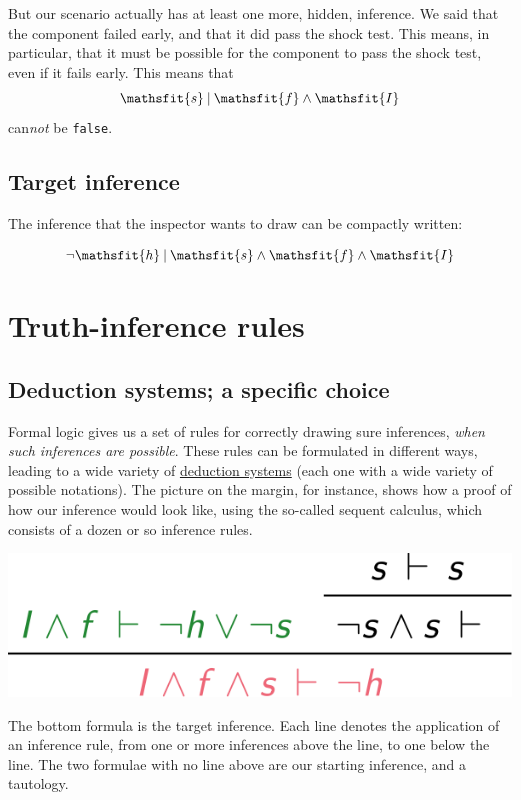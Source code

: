 \documentclass[
  a4paper,
  DIV=11,
  numbers=noendperiod,
  oneside]{scrreprt}
\begin{document}
But our scenario actually has at least one more, hidden, inference. We
said that the component failed early, and that it did pass the shock
test. This means, in particular, that it must be possible for the
component to pass the shock test, even if it fails early. This means
that \[
\mathsfit{s}\nonscript\:\vert\nonscript\:\mathopen{} \mathsfit{f}\land \mathsfit{I}
\] can\emph{not} be \texttt{false}.

\hypertarget{target-inference}{%
\subsection{Target inference}\label{target-inference}}

The inference that the inspector wants to draw can be compactly written:

\[
\lnot\mathsfit{h}\nonscript\:\vert\nonscript\:\mathopen{} \mathsfit{s}\land \mathsfit{f}\land \mathsfit{I}
\]

\hypertarget{truth-inference-rules}{%
\section{Truth-inference rules}\label{truth-inference-rules}}

\hypertarget{deduction-systems-a-specific-choice}{%
\subsection{Deduction systems; a specific
choice}\label{deduction-systems-a-specific-choice}}

Formal logic gives us a set of rules for correctly drawing sure
inferences, \emph{when such inferences are possible}. These rules can be
formulated in different ways, leading to a wide variety of
\href{https://plato.stanford.edu/archives/spr2023/entries/natural-deduction}{deduction
systems} (each one with a wide variety of possible notations). The
picture on the margin, for instance, shows how a proof of how our
inference would look like, using the so-called sequent calculus, which
consists of a dozen or so inference rules.

\begin{marginfigure}

{\centering \includegraphics[width=1\textwidth,height=\textheight]{failure_sequent_red.png}

}

\caption{The {bottom formula} is the target inference. Each line denotes
the application of an inference rule, from one or more inferences above
the line, to one below the line. The two formulae with no line above are
our {starting inference}, and a tautology.}

\end{marginfigure}
\end{document}
